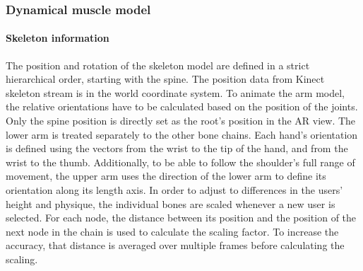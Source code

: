 \subsubsection{Dynamical muscle model}
\paragraph{Skeleton information}
The position and rotation of the skeleton model are defined in a strict hierarchical order, starting with the spine. The position data from Kinect skeleton stream is in the world coordinate system. To animate the arm model, the relative orientations have to be calculated based on the position of the joints. Only the spine position is directly set as the root's position in the AR view. 
The lower arm is treated separately to the other bone chains. Each hand's orientation is defined using the vectors from the wrist to the tip of the hand, and from the wrist to the thumb. Additionally, to be able to follow the shoulder's full range of movement, the upper arm uses the direction of the lower arm to define its orientation along its length axis.
In order to adjust to differences in the users' height and physique, the individual bones are scaled whenever a new user is selected. For each node, the distance between its position and the position of the next node in the chain is used to calculate the scaling factor. To increase the accuracy, that distance is averaged over multiple frames before calculating the scaling.
